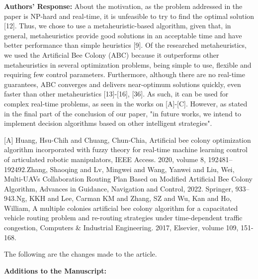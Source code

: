 \textbf{Authors' Response:} About the motivation, as the problem addressed in the paper is NP-hard and real-time, it is unfeasible to try to find the optimal solution [12]. Thus, we chose to use a metaheuristic-based algorithm, given that, in general, metaheuristics provide good solutions in an acceptable time and have better performance than simple heuristics [9]. Of the researched metaheuristics, we used the Artificial Bee Colony (ABC) because it outperforms other metaheuristics in several optimization problems, being simple to use, flexible and requiring few control parameters. Furthermore, although there are no real-time guarantees, ABC converges and delivers near-optimum solutions quickly, even faster than other metaheuristics [13]-[16], [36]. As such, it can be used for complex real-time problems, as seen in the works on [A]-[C]. However, as stated in the final part of the conclusion of our paper, "in future works, we intend to implement decision algorithms based on other intelligent strategies". 

[A] Huang, Hsu-Chih and Chuang, Chun-Chia, Artificial bee colony optimization algorithm incorporated with fuzzy theory for real-time machine learning control of articulated robotic manipulators, IEEE Access. 2020, volume 8, 192481--192492.\newline
[B] Zhang, Shaoqing and Lv, Mingwei and Wang, Yanwei and Liu, Wei, Multi-UAVs Collaboration Routing Plan Based on Modified Artificial Bee Colony Algorithm, Advances in Guidance, Navigation and Control, 2022. Springer, 933--943.\newline
[C] Ng, KKH and Lee, Carman KM and Zhang, SZ and Wu, Kan and Ho, William, A multiple colonies artificial bee colony algorithm for a capacitated vehicle routing problem and re-routing strategies under time-dependent traffic congestion, Computers \& Industrial Engineering. 2017, Elsevier, volume 109, 151-168.

The following are the changes made to the article.

\textbf{Additions to the Manuscript:} 

